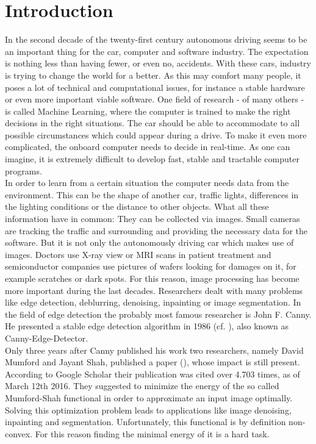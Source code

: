 \documentclass[abstracton]{scrreprt}
\begin{document}
\tableofcontents


\chapter{Introduction} %
\label{cha:introduction}
    In the second decade of the twenty-first century autonomous driving seems to be an important thing for the car, computer and software industry. The expectation is nothing less than having fewer, or even no, accidents. With these cars, industry is trying to change the world for a better. As this may comfort many people, it poses a lot of technical and computational issues, for instance a stable hardware or even more important viable software. One field of research - of many others - is called Machine Learning, where the computer is trained to make the right decisions in the right situations. The car should be able to accommodate to all possible circumstances which could appear during a drive. To make it even more complicated, the onboard computer needs to decide in real-time. As one can imagine, it is extremely difficult to develop fast, stable and tractable computer programs.\\
    In order to learn from a certain situation the computer needs data from the environment. This can be the shape of another car, traffic lights, differences in the lighting conditions or the distance to other objects. What all these information have in common: They can be collected via images. Small cameras are tracking the traffic and surrounding and providing the necessary data for the software. But it is not only the autonomously driving car which makes use of images. Doctors use X-ray view or MRI scans in patient treatment and semiconductor companies use pictures of wafers looking for damages on it, for example scratches or dark spots. For this reason, image processing has become more important during the last decades. Researchers dealt with many problems like edge detection, deblurring, denoising, inpainting or image segmentation. In the field of edge detection the probably most famous researcher is John F. Canny. He presented a stable edge detection algorithm in 1986 (cf. \cite{Canny}), also known as Canny-Edge-Detector.\\
    Only three years after Canny published his work two researchers, namely David Mumford and Jayant Shah, published a paper (\cite{Mumford-et-al-cpam}), whose impact is still present. According to Google Scholar their publication was cited over 4.703 times, as of March 12th 2016. They suggested to minimize the energy of the so called Mumford-Shah functional in order to approximate an input image optimally. Solving this optimization problem leads to applications like image denoising, inpainting and segmentation. Unfortunately, this functional is by definition non-convex. For this reason finding the minimal energy of it is a hard task.\\
\end{document}
